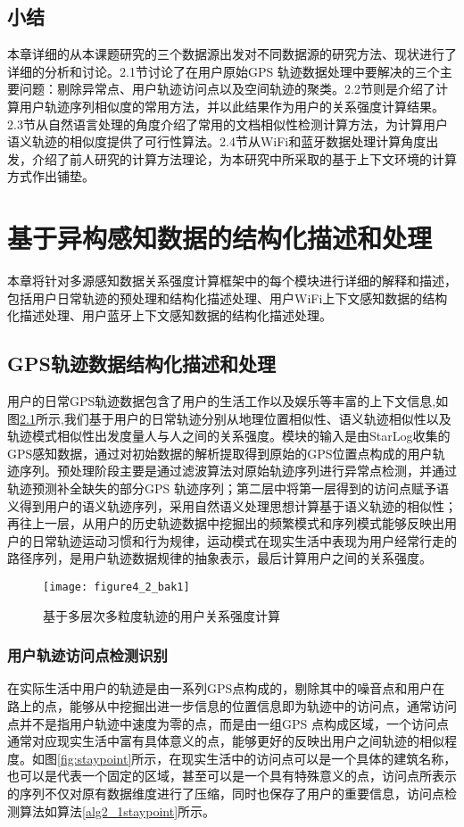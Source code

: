 \section{小结}
\label{sec:section2-4}
本章详细的从本课题研究的三个数据源出发对不同数据源的研究方法、现状进行了详细的分析和讨论。2.1节讨论了在用户原始GPS 轨迹数据处理中要解决的三个主要问题：剔除异常点、用户轨迹访问点以及空间轨迹的聚类。2.2节则是介绍了计算用户轨迹序列相似度的常用方法，并以此结果作为用户的关系强度计算结果。2.3节从自然语言处理的角度介绍了常用的文档相似性检测计算方法，为计算用户语义轨迹的相似度提供了可行性算法。2.4节从WiFi和蓝牙数据处理计算角度出发，介绍了前人研究的计算方法理论，为本研究中所采取的基于上下文环境的计算方式作出铺垫。


\chapter{基于异构感知数据的结构化描述和处理}
\label{chap:chapter03}
本章将针对多源感知数据关系强度计算框架中的每个模块进行详细的解释和描述，包括用户日常轨迹的预处理和结构化描述处理、用户WiFi上下文感知数据的结构化描述处理、用户蓝牙上下文感知数据的结构化描述处理。
\section{GPS轨迹数据结构化描述和处理}
\label{sec:section3-1}
用户的日常GPS轨迹数据包含了用户的生活工作以及娱乐等丰富的上下文信息,如图\ref{fig:tramodel}所示,我们基于用户的日常轨迹分别从地理位置相似性、语义轨迹相似性以及轨迹模式相似性出发度量人与人之间的关系强度。模块的输入是由StarLog收集的GPS感知数据，通过对初始数据的解析提取得到原始的GPS位置点构成的用户轨迹序列。预处理阶段主要是通过滤波算法对原始轨迹序列进行异常点检测，并通过轨迹预测补全缺失的部分GPS 轨迹序列；第二层中将第一层得到的访问点赋予语义得到用户的语义轨迹序列，采用自然语义处理思想计算基于语义轨迹的相似性；再往上一层，从用户的历史轨迹数据中挖掘出的频繁模式和序列模式能够反映出用户的日常轨迹运动习惯和行为规律，运动模式在现实生活中表现为用户经常行走的路径序列，是用户轨迹数据规律的抽象表示，最后计算用户之间的关系强度。
\begin{figure}[htp]
\centering
\texttt{[image: figure4\_2\_bak1]}
\caption{基于多层次多粒度轨迹的用户关系强度计算}
\label{fig:tramodel}
\end{figure}
\subsection{用户轨迹访问点检测识别}
在实际生活中用户的轨迹是由一系列GPS点构成的，剔除其中的噪音点和用户在路上的点，能够从中挖掘出进一步信息的位置信息即为轨迹中的访问点，通常访问点并不是指用户轨迹中速度为零的点，而是由一组GPS 点构成区域，一个访问点通常对应现实生活中富有具体意义的点，能够更好的反映出用户之间轨迹的相似程度。如图\ref{fig:staypoint}所示，在现实生活中的访问点可以是一个具体的建筑名称，也可以是代表一个固定的区域，甚至可以是一个具有特殊意义的点，访问点所表示的序列不仅对原有数据维度进行了压缩，同时也保存了用户的重要信息，访问点检测算法如算法\ref{alg2_1staypoint}所示。

